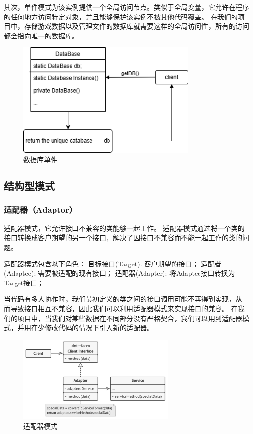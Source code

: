 \documentclass[12pt]{ctexart} %
\begin{document}
其次，单件模式为该实例提供一个全局访问节点。类似于全局变量，它允许在程序的任何地方访问特定对象，并且能够保护该实例不被其他代码覆盖。
在我们的项目中，存储游戏数据以及管理文件的数据库就需要这样的全局访问性，所有的访问都会指向唯一的数据库。
\begin{figure}[H]
  \centering
  \includegraphics[width=0.8\textwidth]{singleton_2.png}
  \caption{数据库单件}
\end{figure}


\subsection{结构型模式} 
\subsubsection{适配器（Adaptor）} 
适配器模式，它允许接口不兼容的类能够一起工作。
适配器模式通过将一个类的接口转换成客户期望的另一个接口，解决了因接口不兼容而不能一起工作的类的问题。

适配器模式包含以下角色：
目标接口(Target): 客户期望的接口；
适配者(Adaptee): 需要被适配的现有接口；
适配器(Adapter): 将Adaptee接口转换为Target接口；

当代码有多人协作时，我们最初定义的类之间的接口调用可能不再得到实现，从
⽽导致接口相互不兼容，因此我们可以利用适配器模式来实现接口的兼容。
在我们的项目中，当我们对某些数据在不同部分没有严格契合，我们可以用到适配器模
式，并用在少修改代码的情况下引入新的适配器。
\begin{figure}[H]
  \centering
  \includegraphics[width=0.7\textwidth]{shipei.png}
  \caption{适配器模式}
\end{figure}
\end{document}
